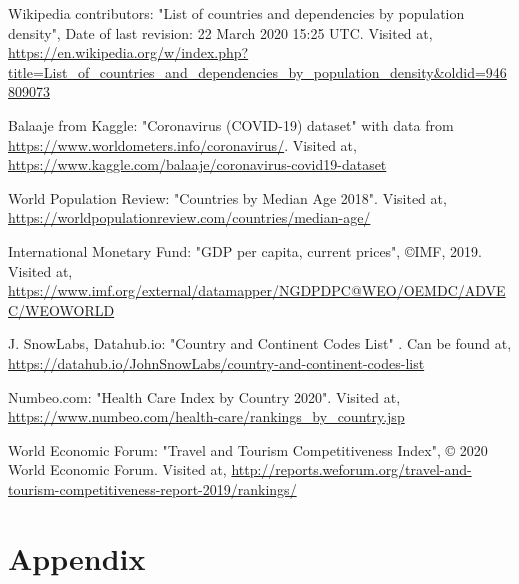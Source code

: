 \documentclass[12pt,fleqn]{article}
\begin{document}
	
	\begin{thebibliography}{9}
		
		 Wikipedia contributors: "List of countries and dependencies by population density", Date of last revision: 22 March 2020 15:25 UTC. Visited at,  \url{ https://en.wikipedia.org/w/index.php?title=List_of_countries_and_dependencies_by_population_density&oldid=946809073}
		
		 Balaaje from Kaggle: "Coronavirus (COVID-19) dataset" with data from \url{https://www.worldometers.info/coronavirus/}. Visited at, \url{https://www.kaggle.com/balaaje/coronavirus-covid19-dataset}
		
		 World Population Review: "Countries by Median Age 2018". Visited at, \url{https://worldpopulationreview.com/countries/median-age/}
		
		 International Monetary Fund: "GDP per capita, current prices", ©IMF, 2019. Visited at, \url{https://www.imf.org/external/datamapper/NGDPDPC@WEO/OEMDC/ADVEC/WEOWORLD}
		
		 J. SnowLabs, Datahub.io: "Country and Continent Codes List" . Can be found at, \url{https://datahub.io/JohnSnowLabs/country-and-continent-codes-list}
		
		 Numbeo.com: "Health Care Index by Country 2020". Visited at, \url{https://www.numbeo.com/health-care/rankings_by_country.jsp}
		
		 World Economic Forum: "Travel and Tourism Competitiveness Index", © 2020 World Economic Forum. Visited at, \url{http://reports.weforum.org/travel-and-tourism-competitiveness-report-2019/rankings/}
		
		
		
		
		
	\end{thebibliography}
	
	\section{Appendix}
	
	
\end{document}

